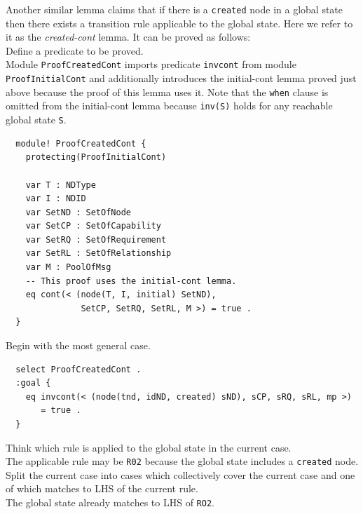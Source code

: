 \documentclass[12pt]{report}
\newcommand{\stt}[1]{{\small{\tt {#1}}}}
\begin{document}
Another similar lemma claims that if there is a {\tt created} node in
a global state then there exists a transition rule applicable to the
global state. Here we refer to it as the {\it created-cont} lemma. It
can be proved as follows:\\

 Define a predicate to be proved.\\
Module {\tt ProofCreatedCont} imports predicate {\tt invcont} from
module {\tt ProofInitialCont} and additionally introduces the
initial-cont lemma proved just above because the proof of this lemma
uses it. Note that the {\tt when} clause is omitted from the
initial-cont lemma because \stt{inv(S)} holds for any reachable global
state {\tt S}.
\small
\begin{verbatim}
  module! ProofCreatedCont {
    protecting(ProofInitialCont)

    var T : NDType
    var I : NDID
    var SetND : SetOfNode
    var SetCP : SetOfCapability
    var SetRQ : SetOfRequirement
    var SetRL : SetOfRelationship
    var M : PoolOfMsg
    -- This proof uses the initial-cont lemma.
    eq cont(< (node(T, I, initial) SetND), 
               SetCP, SetRQ, SetRL, M >) = true .
  }
\end{verbatim}
\normalsize
 Begin with the most general case.
\small
\begin{verbatim}
  select ProofCreatedCont .
  :goal {
    eq invcont(< (node(tnd, idND, created) sND), sCP, sRQ, sRL, mp >)
       = true .
  }
\end{verbatim}
\normalsize
 Think which rule is applied to the 
global state in the current case. \\
The applicable rule may be {\tt R02} because the global state includes
a {\tt created} node.\\

 Split the current case into cases which
collectively cover the current case and one of which matches to LHS of
the current rule. \\ 
The global state already matches to LHS of {\tt RO2}.\\
\end{document}
